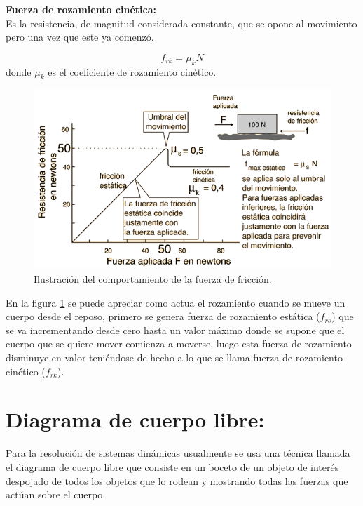 \documentclass[a5paper,pagesize,10pt,bibtotoc,pointlessnumbers,
normalheadings,DIV=9,fleqn,x11names,table,twoside=false]{scrbook}
\begin{document}
\textbf{Fuerza de rozamiento cinética:}\\

Es la resistencia, de magnitud considerada constante, que se opone al movimiento pero una vez que este ya comenzó.

\begin{equation}
f_{rk} = \mu_k N
\end{equation}
donde $\mu_k$ es el coeficiente de rozamiento cinético.

\begin{figure}[ht]
 \centering
 \includegraphics[scale=0.4]{images/fsta.png}
 \caption{Ilustración del comportamiento de la fuerza de fricción.}\label{frb}
\end{figure}

En la figura \ref{frb} se puede apreciar como actua el rozamiento cuando se mueve un cuerpo desde el reposo, primero se genera 
fuerza de rozamiento estática ($f_{rs}$) que se va incrementando desde cero hasta un valor máximo donde se supone que el cuerpo 
que se quiere mover comienza a moverse, luego esta fuerza de rozamiento disminuye en valor teniéndose de hecho a lo que se llama 
fuerza de rozamiento cinético ($f_{rk}$).

\section{Diagrama de cuerpo libre:}

Para la resolución de sistemas dinámicas usualmente se usa una técnica llamada el diagrama de cuerpo libre que consiste en un 
boceto de un objeto de interés despojado de todos los objetos que lo rodean y mostrando todas las fuerzas que actúan sobre el 
cuerpo.\\
\end{document}
